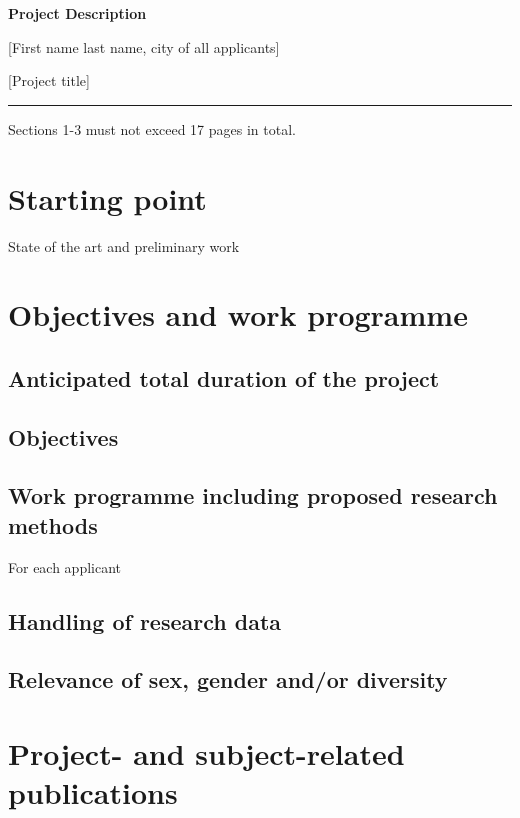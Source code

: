 \documentclass[11pt,a4paper]{article}
\begin{document}
\sloppy


{\Large 

\textbf{Project Description}

\smallskip

[First name  last name, city of all applicants]


\smallskip

[Project title]


\par
}

\medskip

\hrule 

\medskip
\medskip
\medskip
\medskip
\medskip

Sections 1-3 must not exceed 17 pages in total.


\section{Starting point}

State of the art and preliminary work


\section{Objectives and work programme}

\subsection{Anticipated total duration of the project}
\subsection{Objectives}
\subsection{Work programme including proposed research methods}
For each applicant
\subsection{Handling of research data}
\subsection{Relevance of sex, gender and/or diversity}


\section{Project- and subject-related publications}
\end{document}
